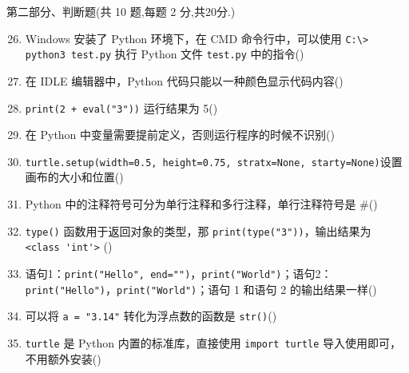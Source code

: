 \documentclass[11pt]{ctexart}
\begin{document}
    {\noindent\heiti 第二部分、判断题(共 10 题,每题 2 分,共20分.)}
    \begin{enumerate}
        \setcounter{enumi}{25}
        \item Windows 安装了 Python 环境下，在 CMD 命令行中，可以使用 \lstinline{C:\> python3 test.py} 执行 Python 文件 \lstinline{test.py} 中的指令(\qquad)

        \item 在 IDLE 编辑器中，Python 代码只能以一种颜色显示代码内容(\qquad)
        
        \item \lstinline{print(2 + eval("3"))} 运行结果为 5(\qquad)
  
        \item 在 Python 中变量需要提前定义，否则运行程序的时候不识别(\qquad)
        
        \item \lstinline{turtle.setup(width=0.5, height=0.75, stratx=None, starty=None)}设置画布的大小和位置(\qquad)
        
        \item Python 中的注释符号可分为单行注释和多行注释，单行注释符号是 \#(\qquad)
        
        \item \lstinline{type()} 函数用于返回对象的类型，那 \lstinline{print(type("3"))}，输出结果为 \lstinline{<class 'int'>} (\qquad) 
        
        \item 语句1：\lstinline{print("Hello", end="")}，\lstinline{print("World")}；语句2：\lstinline{print("Hello")}，\lstinline{print("World")}；语句 1 和语句 2 的输出结果一样(\qquad)
        
        \item 可以将 \lstinline{a = "3.14"} 转化为浮点数的函数是 \lstinline{str()}(\qquad)
        
        \item \lstinline{turtle} 是 Python 内置的标准库，直接使用 \lstinline{import turtle} 导入使用即可，不用额外安装(\qquad)
    \end{enumerate}
\end{document}
